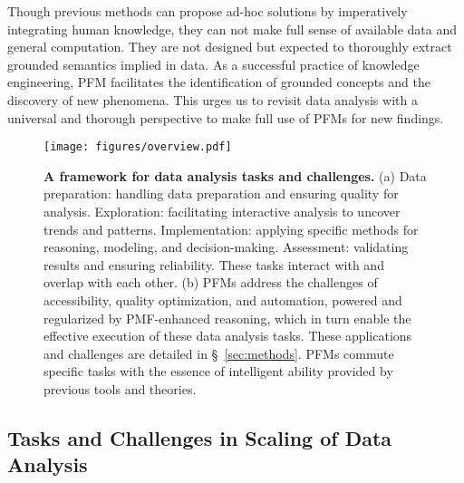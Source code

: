   Though previous methods can propose ad-hoc solutions by imperatively integrating human knowledge, they can not make full sense of available data and general computation. They are not designed but expected to thoroughly extract grounded semantics implied in data. As a successful practice of knowledge engineering, PFM facilitates the identification of grounded concepts and the discovery of new phenomena. This urges us to revisit data analysis with a universal and thorough perspective to make full use of PFMs for new findings.
  

    \begin{figure*}[h] 
    \centering 
    \texttt{[image: figures/overview.pdf]} \label{fig:overview}
  
  \caption{\textbf{A framework for data analysis tasks and challenges.} (a) Data preparation: handling data preparation and ensuring quality for analysis. Exploration: facilitating interactive analysis to uncover trends and patterns. Implementation: applying specific methods for reasoning, modeling, and decision-making. Assessment: validating results and ensuring reliability. These tasks interact with and overlap with each other. (b) PFMs address the challenges of accessibility, quality optimization, and automation, powered and regularized by PMF-enhanced reasoning, which in turn enable the effective execution of these data analysis tasks. These applications and challenges are detailed in \S~\ref{sec:methods}. PFMs commute specific tasks with the essence of intelligent ability provided by previous tools and theories.}
  \end{figure*}

  \subsection{Tasks and Challenges in Scaling of Data Analysis}\label{sec:skeleton}
  

